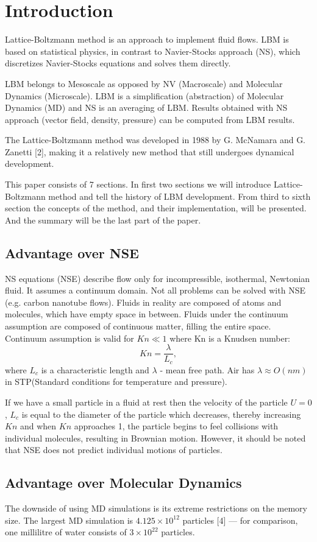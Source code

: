 
\section{Introduction}

Lattice-Boltzmann method is an approach to implement fluid flows. LBM is based on statistical physics, in contrast to Navier-Stocks approach (NS), which discretizes Navier-Stocks equations and solves them directly.

LBM belongs to Mesoscale as opposed by NV (Macroscale) and Molecular Dynamics (Microscale). LBM is a simplification (abstraction) of Molecular Dynamics (MD) and NS is an averaging of LBM. Results obtained with NS approach (vector field, density, pressure) can be computed from LBM results.

The Lattice-Boltzmann method was developed in 1988 by G. McNamara and G. Zanetti [2], making it a relatively new method that still undergoes dynamical development.

This paper consists of 7 sections. In first two sections we will introduce  Lattice-Boltzmann method and tell the history of LBM development. From third to sixth section the concepts of the method, and their  implementation, will be presented. And the  summary will be the last part of the paper.

\subsection{Advantage over NSE}

NS equations (NSE) describe flow only for incompressible, isothermal, Newtonian fluid. It assumes a continuum domain. Not all problems can be solved with NSE (e.g. carbon nanotube flows). Fluids in reality are composed of atoms and molecules, which have empty space in between. Fluids under the continuum assumption are composed of continuous matter, filling the entire space. Continuum assumption is valid for $Kn \ll 1$ where Kn is a Knudsen number:
\begin{equation}
Kn=\frac{\lambda}{L_c},
\end{equation}
where $L_c$ is a characteristic length and $\lambda$ - mean free path. Air has $\lambda \approx O(nm)$ in STP(Standard conditions for temperature and pressure).

If we have a small particle in a fluid at rest then the velocity of the particle $U=0$, $L_c$ is equal to the diameter of the particle which decreases, thereby increasing $Kn$ and when $Kn$ approaches 1, the particle begins to feel collisions with individual molecules, resulting in Brownian motion. However, it should be noted that NSE does not predict individual motions of particles.

\subsection{Advantage over Molecular Dynamics}

The downside of using MD simulations is its extreme restrictions on the memory size. The largest MD simulation is $4.125\times 10^{12}$ particles [4] — for comparison, one millilitre of water consists of $3\times 10^{22}$ particles.